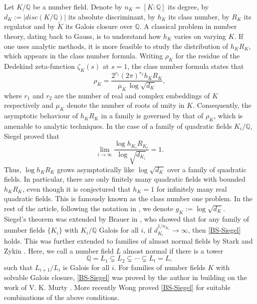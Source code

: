 \documentclass[12pt]{amsart}
\theoremstyle{definition}
\newcommand{\Q}{\mathbb{Q}}
\begin{document}
Let $K/\Q$ be a number field. Denote by $n_K=[K:\Q]$ its degree, by $d_K:= |disc(K/\Q)|$ its absolute discriminant, by $h_K$ its class number, by $R_K$ its regulator and by $\widetilde{K}$ its Galois closure over $\Q$. A classical problem in number theory, dating back to Gauss, is to understand how $h_K$ varies on varying $K$. If one uses analytic methods, it is more feasible to study the distribution of $h_K R_K$, which appears in the class number formula. Writing $\rho_K$ for the residue of the Dedekind zeta-function $\zeta_K(s)$ at $s=1$, the class number formula states that
\begin{equation*}
    \rho_K = \frac{2^{r_1}(2\pi)^{r_2} h_K R_K}{\mu_K\, \log \sqrt{d_K}},
\end{equation*}
where $r_1$ and $r_2$ are the number of real and complex embeddings of $K$ respectively and $\mu_K$ denote the number of roots of unity in $K$. Consequently, the asymptotic behaviour of $h_KR_K$ in a family is governed by that of $\rho_K$, which is amenable to analytic techniques. In the case of a family of quadratic fields $K_i/\Q$, Siegel \cite{Sie} proved that
\begin{equation}\label{BS-Siegel}
    \lim_{i\to\infty} \frac{\log h_{K_i}R_{K_i}}{\log \sqrt{d_{K_i}}} = 1.
\end{equation}
Thus,  $\log h_K R_K$ grows asymptotically like $\log \sqrt{d_K}$ over a family of quadratic fields. In particular, there are only finitely many quadratic fields with bounded $h_KR_K$, even though it is conjectured that $h_K=1$ for infinitely many real quadratic fields. This is famously known as the class number one problem. In the rest of the article, following the notation in \cite{TV}, we denote $g_K:=\log \sqrt{d_K}$.\\

Siegel's theorem was extended by Brauer in \cite{BS}, who showed that for any family of number fields $\{K_i\}$ with $K_i/\Q$ Galois for all $i$, if $d_{K_i}^{1/n_{K_i}} \to\infty$, then \eqref{BS-Siegel} holds. This was further extended to families of almost normal fields by Stark \cite{Stk} and Zykin \cite{Zyk}. Here, we call a number field $L$ almost normal if there is a tower
\begin{equation*}
    \Q=L_1\subsetneq L_2\subsetneq\cdots \subsetneq L_t=L,
\end{equation*}
such that $L_{i+1}/L_i$ is Galois for all $i$. For families of number fields $K$ with solvable Galois closure, \eqref{BS-Siegel} was proved by the author in \cite{Dixit} building on the work of V. K. Murty \cite{Km}. More recently Wong \cite{peng} proved \eqref{BS-Siegel} for suitable combinations of the above conditions.\\
\end{document}
